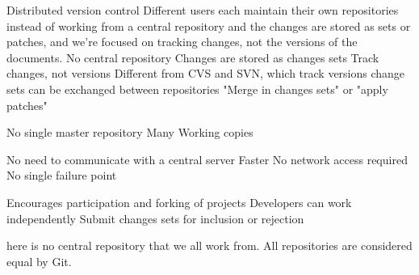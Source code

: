 Distributed version control 
  Different users each maintain their own repositories instead of working from a central repository
  and the changes are stored as sets or patches, and we're focused on tracking changes, not the versions of the documents.
  No central repository
  Changes are stored as changes sets 
    Track changes, not versions
    Different from CVS and SVN, which track versions
    change sets can be exchanged between repositories
    "Merge in changes sets" or "apply patches"

  No single master repository
  Many Working copies

  No need to communicate with a central server 
  Faster 
  No network access required
  No single failure point 

  Encourages participation and forking of projects 
  Developers can work independently  
  Submit changes sets for inclusion or rejection 

  here is no central repository that we all work from. All repositories are considered equal by Git.
